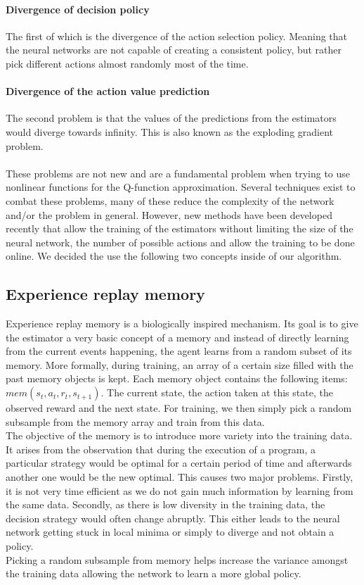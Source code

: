 \paragraph{Divergence of decision policy}
The first of which is the divergence of the action selection policy. Meaning that the neural networks are not capable of creating a consistent policy, but rather pick different actions almost randomly most of the time.
\paragraph{Divergence of the action value prediction}
The second problem is that the values of the predictions from the estimators would diverge towards infinity. This is also known as the exploding gradient problem.\\
\mbox{}\\
These problems are not new and are a fundamental problem when trying to use nonlinear functions for the Q-function approximation. Several techniques exist to combat these problems, many of these reduce the complexity of the network and/or the problem in general. However, new methods have been developed recently that allow the training of the estimators without limiting the size of the neural network, the number of possible actions and allow the training to be done online. We decided the use the following two concepts inside of our algorithm.
\subsection{Experience replay memory}
Experience replay memory \cite{Mnih2015} is a biologically inspired mechanism. Its goal is to give the estimator a very basic concept of a memory and instead of directly learning from the current events happening, the agent learns from a random subset of its memory. More formally, during training, an array of a certain size filled with the past memory objects is kept. Each memory object contains the following items: $mem(s_t, a_t, r_t, s_{t+1})$. The current state, the action taken at this state, the observed reward and the next state. For training, we then simply pick a random subsample from the memory array and train from this data.
\\
The objective of the memory is to introduce more variety into the training data. It arises from the observation that during the execution of a program, a particular strategy would be optimal for a certain period of time and afterwards another one would be the new optimal. This causes two major problems. Firstly, it is not very time efficient as we do not gain much information by learning from the same data. Secondly, as there is low diversity in the training data, the decision strategy would often change abruptly. This either leads to the neural network getting stuck in local minima or simply to diverge and not obtain a policy. \\
Picking a random subsample from memory helps increase the variance amongst the training data allowing the network to learn a more global policy. 

